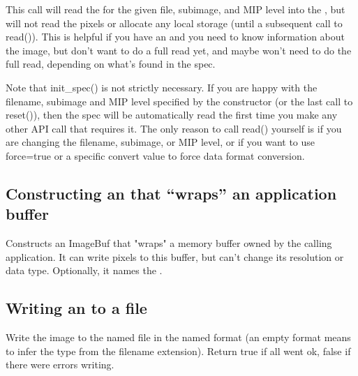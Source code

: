 This call will read the \ImageSpec for the given file, subimage, and
MIP level into the \ImageBuf, but will not read the pixels or allocate
any local storage (until a subsequent call to {\cf read()}).  This is
helpful if you have an \ImageBuf and you need to know information about
the image, but don't want to do a full read yet, and maybe won't need
to do the full read, depending on what's found in the spec.

Note that {\cf init_spec()} is not strictly necessary. If you are happy with
the filename, subimage and MIP level specified by the \ImageBuf constructor
(or the last call to {\cf reset()}), then the spec will be automatically
read the first time you make any other \ImageBuf API call that requires it.
The only reason to call {\cf read()} yourself is if you are changing the
filename, subimage, or MIP level, or if you want to use {\cf force=true} or
a specific {\cf convert} value to force data format conversion.
\apiend


\subsection*{Constructing an \ImageBuf that ``wraps'' an application buffer}

Constructs an ImageBuf that "wraps" a memory buffer owned by the calling
application.  It can write pixels to this buffer, but can't change its
resolution or data type.  Optionally, it names the \ImageBuf.
\apiend


\subsection*{Writing an \ImageBuf to a file}

Write the image to the named file in the named format
(an empty format means to infer the type from the filename
extension).  Return {\cf true} if all went ok, {\cf false} if there were
errors writing.


